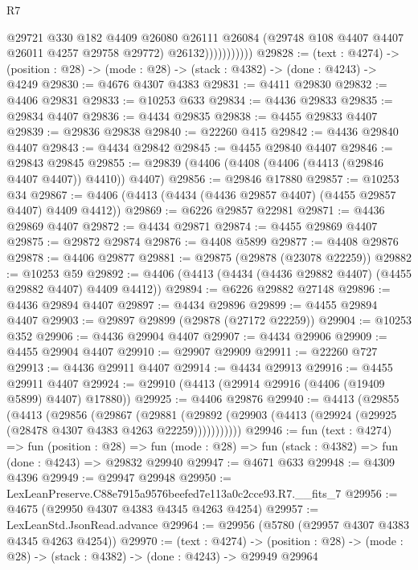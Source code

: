 \begin{lexlean}{R7}
\begin{coremodule}
                        @29721
                          @330
                          @182
                          @4409
                          @26080
                          @26111
                          @26084
                          (@29748 @108 @4407 @4407 @26011 @4257 @29758 @29772)
                          @26132)))))))))))
@29828 := (text : @4274) ->
  (position : @28) -> (mode : @28) -> (stack : @4382) -> (done : @4243) -> @4249
@29830 := @4676 @4307 @4383
@29831 := @4411 @29830
@29832 := @4406 @29831
@29833 := @10253 @633
@29834 := @4436 @29833
@29835 := @29834 @4407
@29836 := @4434 @29835
@29838 := @4455 @29833 @4407
@29839 := @29836 @29838
@29840 := @22260 @415
@29842 := @4436 @29840 @4407
@29843 := @4434 @29842
@29845 := @4455 @29840 @4407
@29846 := @29843 @29845
@29855 := @29839 (@4406 (@4408 (@4406 (@4413 (@29846 @4407 @4407)) @4410)) @4407)
@29856 := @29846 @17880
@29857 := @10253 @34
@29867 := @4406 (@4413 (@4434 (@4436 @29857 @4407) (@4455 @29857 @4407) @4409 @4412))
@29869 := @6226 @29857 @22981
@29871 := @4436 @29869 @4407
@29872 := @4434 @29871
@29874 := @4455 @29869 @4407
@29875 := @29872 @29874
@29876 := @4408 @5899
@29877 := @4408 @29876
@29878 := @4406 @29877
@29881 := @29875 (@29878 (@23078 @22259))
@29882 := @10253 @59
@29892 := @4406 (@4413 (@4434 (@4436 @29882 @4407) (@4455 @29882 @4407) @4409 @4412))
@29894 := @6226 @29882 @27148
@29896 := @4436 @29894 @4407
@29897 := @4434 @29896
@29899 := @4455 @29894 @4407
@29903 := @29897 @29899 (@29878 (@27172 @22259))
@29904 := @10253 @352
@29906 := @4436 @29904 @4407
@29907 := @4434 @29906
@29909 := @4455 @29904 @4407
@29910 := @29907 @29909
@29911 := @22260 @727
@29913 := @4436 @29911 @4407
@29914 := @4434 @29913
@29916 := @4455 @29911 @4407
@29924 := @29910 (@4413 (@29914 @29916 (@4406 (@19409 @5899) @4407) @17880))
@29925 := @4406 @29876
@29940 := @4413
    (@29855
      (@4413
        (@29856
          (@29867
            (@29881
              (@29892 (@29903 (@4413 (@29924 (@29925 (@28478 @4307 @4383 @4263 @22259)))))))))))
@29946 := fun (text : @4274) =>
  fun (position : @28) =>
  fun (mode : @28) => fun (stack : @4382) => fun (done : @4243) => @29832 @29940
@29947 := @4671 @633
@29948 := @4309 @4396
@29949 := @29947 @29948
@29950 := LexLeanPreserve.C88e7915a9576beefed7e113a0c2cce93.R7.__fits_7
@29956 := @4675 (@29950 @4307 @4383 @4345 @4263 @4254)
@29957 := LexLeanStd.JsonRead.advance
@29964 := @29956 (@5780 (@29957 @4307 @4383 @4345 @4263 @4254))
@29970 := (text : @4274) ->
  (position : @28) -> (mode : @28) -> (stack : @4382) -> (done : @4243) -> @29949 @29964

\end{coremodule}
\end{lexlean}
